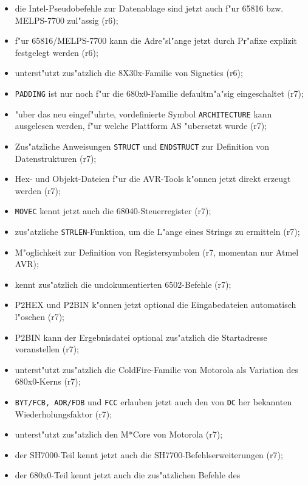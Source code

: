 \documentclass[12pt,a4paper,twoside]{report}
\newcommand{\tty}[1]{{\tt #1}}
\begin{document}
\begin{itemize}
{\begin{itemize}
      \item{die Intel-Pseudobefehle zur Datenablage sind jetzt
            auch f"ur 65816 bzw. MELPS-7700 zul"assig (r6);}
      \item{f"ur 65816/MELPS-7700 kann die Adre"sl"ange jetzt durch
            Pr"afixe explizit festgelegt werden (r6);}
      \item{unterst"utzt zus"atzlich die 8X30x-Familie von Signetics
            (r6);}
      \item{\tty{PADDING} ist nur noch f"ur die 680x0-Familie defaultm"a"sig
            eingeschaltet (r7);}
      \item{"uber das neu eingef"uhrte, vordefinierte Symbol
            \tty{ARCHITECTURE} kann ausgelesen werden, f"ur welche
            Plattform AS "ubersetzt wurde (r7);}
      \item{Zus"atzliche Anweisungen \tty{STRUCT} und \tty{ENDSTRUCT} zur
            Definition von Datenstrukturen (r7);}
      \item{Hex- und Objekt-Dateien f"ur die AVR-Tools k"onnen jetzt
            direkt erzeugt werden (r7);}
      \item{\tty{MOVEC} kennt jetzt auch die 68040-Steuerregister (r7);}
      \item{zus"atzliche \tty{STRLEN}-Funktion, um die L"ange eines
            Strings zu ermitteln (r7);}
      \item{M"oglichkeit zur Definition von Registersymbolen (r7, momentan
            nur Atmel AVR);}
      \item{kennt zus"atzlich die undokumentierten 6502-Befehle (r7);}
      \item{P2HEX und P2BIN k"onnen jetzt optional die Eingabedateien
            automatisch l"oschen (r7);}
      \item{P2BIN kann der Ergebnisdatei optional zus"atzlich die
            Startadresse voranstellen (r7);}
      \item{unterst"utzt zus"atzlich die ColdFire-Familie von Motorola als
            Variation des 680x0-Kerns (r7);}
      \item{\tty{BYT/FCB, ADR/FDB} und \tty{FCC} erlauben jetzt auch den
            von \tty{DC} her bekannten Wiederholungsfaktor (r7);}
      \item{unterst"utzt zus"atzlich den M*Core von Motorola (r7);}
      \item{der SH7000-Teil kennt jetzt auch die SH7700-Befehlserweiterungen
            (r7);}
      \item{der 680x0-Teil kennt jetzt auch die zus"atzlichen Befehle des
}
\end{itemize}}
\end{itemize}
\end{document}
